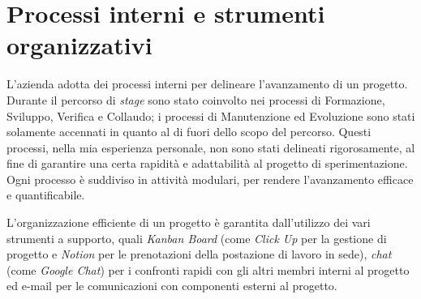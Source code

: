 

\section{Processi interni e strumenti organizzativi}

%


L'azienda adotta dei processi interni per delineare l'avanzamento di un progetto.
Durante il percorso di \textit{stage} sono stato coinvolto nei processi di Formazione, Sviluppo, Verifica e Collaudo; i processi di Manutenzione ed Evoluzione sono stati solamente accennati in quanto al di fuori dello scopo del percorso.
Questi processi, nella mia esperienza personale, non sono stati delineati rigorosamente, al fine di garantire una certa rapidità e adattabilità al progetto di sperimentazione.
Ogni processo è suddiviso in attività modulari, per rendere l'avanzamento efficace e quantificabile.

L'organizzazione efficiente di un progetto è garantita dall'utilizzo dei vari strumenti a supporto, quali \textit{Kanban Board} (come \textit{Click Up} per la gestione di progetto e \textit{Notion} per le prenotazioni della postazione di lavoro in sede), \textit{chat} (come \textit{Google Chat}) per i confronti rapidi con gli altri membri interni al progetto ed e-mail per le comunicazioni con componenti esterni al progetto.

